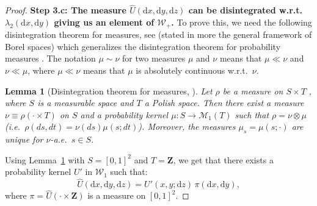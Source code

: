 \documentclass{amsart}
\newcommand{\wrt}{w.r.t.\ }
\newcommand{\aE}{a.e.\ }
\newcommand{\ie}{i.e.\ }
\theoremstyle{plain}
\newtheorem{lemme}[Th]{Lemma}
\theoremstyle{definition}
\newcommand{\Space}{\mathbf{Z}}
\newcommand{\ProbaX}[1]{\mathcal{M}_1(#1)}
\newcommand{\Graphon}{\mathcal{W}_1}
\newcommand{\Kernelp}{\mathcal{W}_{+}}
\newcommand{\drv}{\mathrm{d}}
\newcommand{\rd}{\mathrm{d}}
\begin{document}
\begin{proof}
\medskip

\textbf{Step 3.c: The measure $\hat U (\rd x, \rd y, \rd z)$ can be disintegrated
\wrt $\lambda_2(\rd x, \rd y)$ giving us an element of $\Kernelp$.}
To prove this, we need the following disintegration theorem for measures,
	see \cite[Theorem 1.23]{KallenbergRMTA} (stated in more the general
        framework of Borel spaces) which generalizes 
	the disintegration theorem for probability measures \cite[Theorem 6.3]{Kallenberg}.
 The notation $\mu \sim \nu$ for two measures $\mu$ and $\nu$
 means that $\mu \ll \nu$ and $\nu \ll \mu$,
 where $\mu \ll \nu$ means that $\mu$ is absolutely continuous
 \wrt $\nu$.

\begin{lemme}[Disintegration theorem for measures, {\cite[Theorem 1.23]{KallenbergRMTA}}]
	\label{disintegration_theorem_positive_measure}
Let $\rho$ be a measure on $S\times T$ , where $S$ is
a measurable space and $T$  a Polish space. 
Then there exist a measure $\nu\equiv \rho(\cdot \times T)$ on $S$ 
	and a probability kernel $\mu:S\to \ProbaX{T}$ 
such that $\rho = \nu \otimes \mu$ (\ie $\rho(ds,dt)=\nu(ds)\mu(s;dt)$).
Moreover, the measures $\mu_s = \mu(s;\cdot)$ are unique for $\nu$-\aE $s \in S$.
\end{lemme}

Using  Lemma~\ref{disintegration_theorem_positive_measure} with $S=[0,1]^2$ and $T=\Space$,
we get that there exists a probability kernel $U'$ in $\Graphon$ such that:
\[
  \hat U(\drv x,\drv y , \drv z) = U'(x,y;\drv z)\, \pi(\drv x,\drv y),
\]
where $\pi =  \hat U  (\cdot \times \Space)$
is a measure on $[0,1]^2$.


\end{proof}
\end{document}
